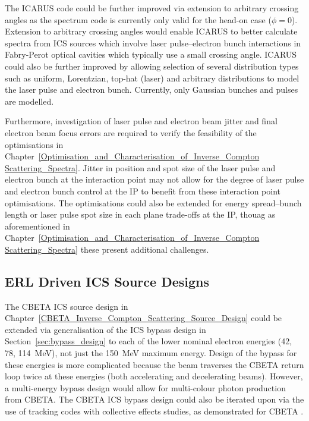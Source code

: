 \documentclass[../main.tex]{subfiles}
\begin{document}
The \textsc{ICARUS} code could be further improved via extension to arbitrary crossing angles as the spectrum code is currently only valid for the head-on case ($\phi=0$). Extension to arbitrary crossing angles would enable \textsc{ICARUS} to better calculate spectra from ICS sources which involve laser pulse--electron bunch interactions in Fabry-Perot optical cavities which typically use a small crossing angle. \textsc{ICARUS} could also be further improved by allowing selection of several distribution types such as uniform, Lorentzian, top-hat (laser) and arbitrary distributions to model the laser pulse and electron bunch. Currently, only Gaussian bunches and pulses are modelled.

Furthermore, investigation of laser pulse and electron beam jitter and final electron beam focus errors are required to verify the feasibility of the optimisations in Chapter~\ref{Optimisation_and_Characterisation_of_Inverse_Compton Scattering_Spectra}. Jitter in position and spot size of the laser pulse and electron bunch at the interaction point may not allow for the degree of laser pulse and electron bunch control at the IP to benefit from these interaction point optimisations. The optimisations could also be extended for energy spread--bunch length or laser pulse spot size in each plane trade-offs at the IP, thouag as aforementioned in Chapter~\ref{Optimisation_and_Characterisation_of_Inverse_Compton Scattering_Spectra} these present additional challenges.   

\subsection{ERL Driven ICS Source Designs}

The CBETA ICS source design in Chapter~\ref{CBETA_Inverse_Compton_Scattering_Source_Design} could be extended via generalisation of the ICS bypass design in Section~\ref{sec:bypass_design} to each of the lower nominal electron energies (42, 78, 114~\si{\mega\electronvolt}), not just the 150~\si{\mega\electronvolt} maximum energy. Design of the bypass for these energies is more complicated because the beam traverses the CBETA return loop twice at these energies (both accelerating and decelerating beams). However, a multi-energy bypass design would allow for multi-colour photon production from CBETA. The CBETA ICS bypass design could also be iterated upon via the use of tracking codes with collective effects studies, as demonstrated for CBETA \cite{lou2019beam,lou2020coherent}.
\end{document}
